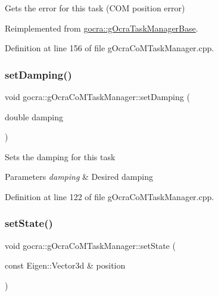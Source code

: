 Gets the error for this task (C\+OM position error) 

Reimplemented from \hyperlink{classgocra_1_1gOcraTaskManagerBase_a5c40a14b3a1d5a6519da422310d28f97}{gocra\+::g\+Ocra\+Task\+Manager\+Base}.



Definition at line 156 of file g\+Ocra\+Co\+M\+Task\+Manager.\+cpp.

\hypertarget{classgocra_1_1gOcraCoMTaskManager_afe1e6ca547d469d3b504fccad7a9567d}{}\label{classgocra_1_1gOcraCoMTaskManager_afe1e6ca547d469d3b504fccad7a9567d} 
\subsubsection{\texorpdfstring{set\+Damping()}{setDamping()}}
{\footnotesize\ttfamily void gocra\+::g\+Ocra\+Co\+M\+Task\+Manager\+::set\+Damping (\begin{DoxyParamCaption}\item[{double}]{damping }\end{DoxyParamCaption})}

Sets the damping for this task


\begin{DoxyParams}{Parameters}
{\em damping} & Desired damping \\
\hline
\end{DoxyParams}


Definition at line 122 of file g\+Ocra\+Co\+M\+Task\+Manager.\+cpp.

\hypertarget{classgocra_1_1gOcraCoMTaskManager_a413a7722455a89c99c4efd11e8226104}{}\label{classgocra_1_1gOcraCoMTaskManager_a413a7722455a89c99c4efd11e8226104} 
\subsubsection{\texorpdfstring{set\+State()}{setState()}\hspace{0.1cm}{\footnotesize\ttfamily [1/2]}}
{\footnotesize\ttfamily void gocra\+::g\+Ocra\+Co\+M\+Task\+Manager\+::set\+State (\begin{DoxyParamCaption}\item[{const Eigen\+::\+Vector3d \&}]{position }\end{DoxyParamCaption})}

